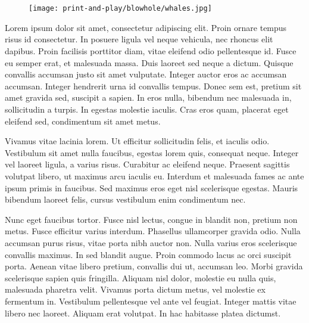 \chapter{\bh} \label{ch:blowhole}
  \begin{figure}[h]
    \centering
    \texttt{[image: print-and-play/blowhole/whales.jpg]}
  \end{figure}


  Lorem ipsum dolor sit amet, consectetur adipiscing elit. Proin ornare tempus
  risus id consectetur. In posuere ligula vel neque vehicula, nec rhoncus elit
  dapibus. Proin facilisis porttitor diam, vitae eleifend odio pellentesque id.
  Fusce eu semper erat, et malesuada massa. Duis laoreet sed neque a dictum.
  Quisque convallis accumsan justo sit amet vulputate. Integer auctor eros ac
  accumsan accumsan. Integer hendrerit urna id convallis tempus. Donec sem est,
  pretium sit amet gravida sed, suscipit a sapien. In eros nulla, bibendum nec
  malesuada in, sollicitudin a turpis. In egestas molestie iaculis. Cras eros
  quam, placerat eget eleifend sed, condimentum sit amet metus.

  Vivamus vitae lacinia lorem. Ut efficitur sollicitudin felis, et iaculis odio.
  Vestibulum sit amet nulla faucibus, egestas lorem quis, consequat neque.
  Integer vel laoreet ligula, a varius risus. Curabitur ac eleifend neque.
  Praesent sagittis volutpat libero, ut maximus arcu iaculis eu. Interdum et
  malesuada fames ac ante ipsum primis in faucibus. Sed maximus eros eget nisl
  scelerisque egestas. Mauris bibendum laoreet felis, cursus vestibulum enim
  condimentum nec.

  Nunc eget faucibus tortor. Fusce nisl lectus, congue in blandit non, pretium
  non metus. Fusce efficitur varius interdum. Phasellus ullamcorper gravida
  odio. Nulla accumsan purus risus, vitae porta nibh auctor non. Nulla varius
  eros scelerisque convallis maximus. In sed blandit augue. Proin commodo lacus
  ac orci suscipit porta. Aenean vitae libero pretium, convallis dui ut,
  accumsan leo. Morbi gravida scelerisque sapien quis fringilla. Aliquam nisl
  dolor, molestie eu nulla quis, malesuada pharetra velit. Vivamus porta dictum
  metus, vel molestie ex fermentum in. Vestibulum pellentesque vel ante vel
  feugiat. Integer mattis vitae libero nec laoreet. Aliquam erat volutpat. In
  hac habitasse platea dictumst.

  \newpage

